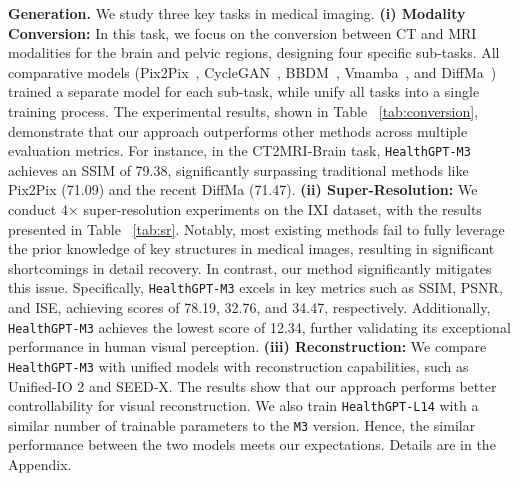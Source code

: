 \noindent \textbf{Generation.}  
We study three key tasks in medical imaging.  
\textbf{(i) Modality Conversion:} In this task, we focus on the conversion between CT and MRI modalities for the brain and pelvic regions, designing four specific sub-tasks. All comparative models (Pix2Pix~\cite{isola2017image}, CycleGAN~\cite{zhu2017unpaired}, BBDM~\cite{li2023bbdm}, Vmamba~\cite{liu2024vmamba}, and DiffMa~\cite{wang2024soft}) trained a separate model for each sub-task, while \ourmethod{} unify all tasks into a single training process. 
The experimental results, shown in Table ~\ref{tab:conversion}, demonstrate that our approach outperforms other methods across multiple evaluation metrics. For instance, in the CT2MRI-Brain task, \texttt{HealthGPT-M3} achieves an SSIM of 79.38, significantly surpassing traditional methods like Pix2Pix (71.09) and the recent DiffMa (71.47). 
\textbf{(ii) Super-Resolution:} We conduct 4× super-resolution experiments on the IXI dataset, with the results presented in Table ~\ref{tab:sr}. Notably, most existing methods fail to fully leverage the prior knowledge of key structures in medical images, resulting in significant shortcomings in detail recovery. 
In contrast, our method significantly mitigates this issue. Specifically, \texttt{HealthGPT-M3} excels in key metrics such as SSIM, PSNR, and ISE, achieving scores of 78.19, 32.76, and 34.47, respectively. 
Additionally, \texttt{HealthGPT-M3} achieves the lowest score of 12.34, further validating its exceptional performance in human visual perception. \textbf{(iii) Reconstruction:} 
We compare \texttt{HealthGPT-M3} with unified models with reconstruction capabilities, such as Unified-IO 2 and SEED-X. The results show that our approach performs better controllability for visual reconstruction. We also train \texttt{HealthGPT-L14} with a similar number of trainable parameters to the \texttt{M3} version. Hence, the similar performance between the two models meets our expectations. Details are in the Appendix. 

% 

